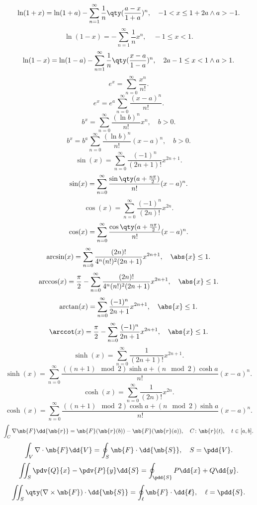 \documentclass[a4paper,12pt]{article}
\begin{document}
\[\ln(1+x)=\ln(1+a)-\sum_{n=1}^{\infty}\frac{1}{n}\qty(\frac{a-x}{1+a})^n,\quad -1<x\le 1+2a\land a>-1.\]
\[\ln(1-x)=-\sum_{n=1}^{\infty}\frac{1}{n}x^n,\quad -1\le x<1.\]
\[\ln(1-x)=\ln(1-a)-\sum_{n=1}^{\infty}\frac{1}{n}\qty(\frac{x-a}{1-a})^n,\quad 2a-1\le x<1\land a>1.\]
\[e^x=\sum_{n=0}^{\infty}\frac{x^n}{n!}.\]
\[e^x=e^a\sum_{n=0}^{\infty}\frac{(x-a)^n}{n!}.\]
\[b^x=\sum_{n=0}^{\infty}\frac{(\ln b)^n}{n!}x^n,\quad b>0.\]
\[b^x=b^a\sum_{n=0}^{\infty}\frac{(\ln b)^n}{n!}(x-a)^n,\quad b>0.\]
\[\sin(x)=\sum_{n=0}^{\infty}\frac{(-1)^n}{(2n+1)!}x^{2n+1}.\]
\[\sin(x)=\sum_{n=0}^{\infty}\frac{\sin\qty(a+\frac{n\pi}{2})}{n!}(x-a)^n.\]
\[\cos(x)=\sum_{n=0}^{\infty}\frac{(-1)^n}{(2n)!}x^{2n}.\]
\[\cos(x)=\sum_{n=0}^{\infty}\frac{\cos\qty(a+\frac{n\pi}{2})}{n!}(x-a)^n.\]
\[\arcsin(x)=\sum_{n=0}^{\infty}\frac{(2n)!}{4^n(n!)^2(2n+1)}x^{2n+1},\quad\abs{x}\le1.\]
\[\arccos(x)=\frac{\pi}{2}-\sum_{n=0}^{\infty}\frac{(2n)!}{4^n(n!)^2(2n+1)}x^{2n+1},\quad\abs{x}\le1.\]
\[\arctan(x)=\sum_{n=0}^{\infty}\frac{(-1)^n}{2n+1}x^{2n+1},\quad\abs{x}\le1.\]
\[\arccot(x)=\frac{\pi}{2}-\sum_{n=0}^{\infty}\frac{(-1)^n}{2n+1}x^{2n+1},\quad\abs{x}\le1.\]
\[\sinh(x)=\sum_{n=0}^{\infty}\frac{1}{(2n+1)!}x^{2n+1}.\]
\[\sinh(x)=\sum_{n=0}^{\infty}\frac{((n+1)\mod 2)\sinh a+(n\mod 2)\cosh a}{n!}(x-a)^n.\]
\[\cosh(x)=\sum_{n=0}^{\infty}\frac{1}{(2n)!}x^{2n}.\]
\[\cosh(x)=\sum_{n=0}^{\infty}\frac{((n+1)\mod 2)\cosh a+(n\mod 2)\sinh a}{n!}(x-a)^n.\]
\[\int_C\nabla\mb{F}\dd{\mb{r}}=\mb{F}(\mb{r}(b))-\mb{F}(\mb{r}(a)),\quad C\colon\mb{r}(t),\quad t\in[a,b].\]
\[\int_V\nabla\cdot\mb{F}\dd{V}=\oint_S\mb{F}\cdot\dd{\mb{S}},\quad S=\pdd{V}.\]
\[\iint_S\pdv{Q}{x}-\pdv{P}{y}\dd{S}=\oint_{\pdd{S}}P\dd{x}+Q\dd{y}.\]
\[\iint_S\qty(\nabla\times\mb{F})\cdot\dd{\mb{S}}=\oint_{\ell}\mb{F}\cdot\dd{\boldsymbol{\ell}},\quad\ell=\pdd{S}.\]
\end{document}
